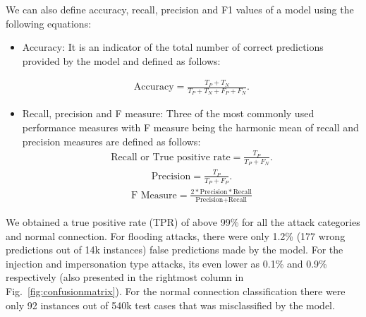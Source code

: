 \documentclass[letterpaper, 10pt, conference]{ieeeconf} %
\newcommand{\fig}[1]{Fig.~\ref{#1}}
\begin{document}
We can also define accuracy, recall, precision and F1 values of a model  using the following equations:

\begin{itemize}
\item {Accuracy: It is an indicator of the total number of correct predictions provided by the model and defined as follows:

\begin{align}
\text{Accuracy} =\frac{T_P+T_N}{T_P+T_N+F_P+F_N}.
\end{align}
}
\item {Recall, precision and F measure: Three of the most commonly used performance measures with F measure being the harmonic mean of recall and precision measures are defined as follows:
\begin{align}
\text{Recall or True positive rate} =\frac{T_P}{T_P+F_N}.
\end{align}
\begin{align}
\text{Precision} =\frac{T_P}{T_P+F_P}.
\end{align}}
\begin{align}
{\text{F \ Measure}} =\frac{2*{\text{Precision}}*{\text{Recall}}}{\text{Precision+Recall}}
\end{align}

 
\end{itemize}
We obtained a true positive rate (TPR) of above 99\% for all the attack categories and normal connection.  For flooding attacks, there were only 1.2\% (177 wrong predictions out of 14k instances) false predictions made by the model. For the injection and impersonation type attacks, its even lower as 0.1\% and 0.9\% respectively (also presented in the rightmost column in \fig{fig:confusionmatrix}). For the normal connection classification there were only 92 instances out of 540k test cases that was misclassified by the model.
\end{document}

